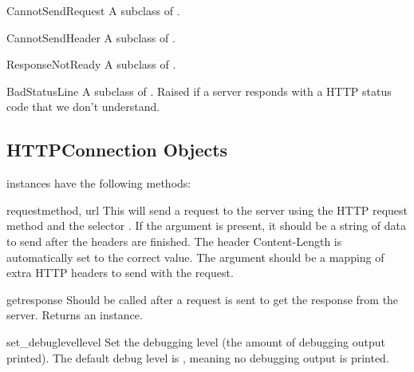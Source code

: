 \begin{excdesc}{CannotSendRequest}
A subclass of .
\end{excdesc}

\begin{excdesc}{CannotSendHeader}
A subclass of .
\end{excdesc}

\begin{excdesc}{ResponseNotReady}
A subclass of .
\end{excdesc}

\begin{excdesc}{BadStatusLine}
A subclass of .  Raised if a server responds with a
HTTP status code that we don't understand.
\end{excdesc}


\subsection{HTTPConnection Objects \label{httpconnection-objects}}

 instances have the following methods:

\begin{methoddesc}{request}{method, url}
This will send a request to the server using the HTTP request method
 and the selector .  If the  argument is
present, it should be a string of data to send after the headers are finished.
The header Content-Length is automatically set to the correct value.
The  argument should be a mapping of extra HTTP headers to send
with the request.
\end{methoddesc}

\begin{methoddesc}{getresponse}{}
Should be called after a request is sent to get the response from the server.
Returns an  instance.
\end{methoddesc}

\begin{methoddesc}{set_debuglevel}{level}
Set the debugging level (the amount of debugging output printed).
The default debug level is , meaning no debugging output is
printed.
\end{methoddesc}

